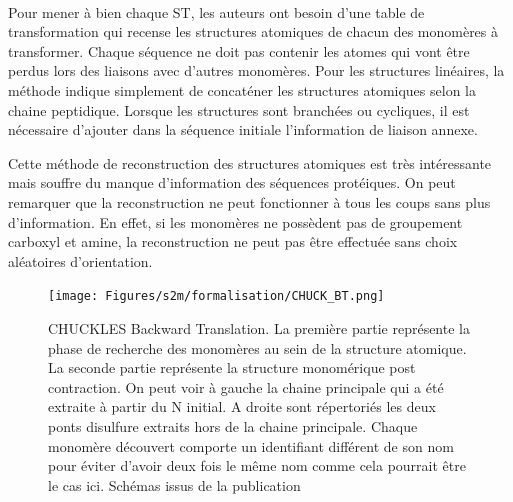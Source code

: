 \documentclass[12pt,french,twoside]{report}
\begin{document}
\paragraph{}Pour mener à bien chaque ST, les auteurs ont besoin d'une table de transformation qui recense les structures atomiques de chacun des monomères à transformer.
Chaque séquence ne doit pas contenir les atomes qui vont être perdus lors des liaisons avec d'autres monomères.
Pour les structures linéaires, la méthode indique simplement de concaténer les structures atomiques selon la chaine peptidique.
Lorsque les structures sont branchées ou cycliques, il est nécessaire d'ajouter dans la séquence initiale l'information de liaison annexe.

Cette méthode de reconstruction des structures atomiques est très intéressante mais souffre du manque d'information des séquences protéiques.
On peut remarquer que la reconstruction ne peut fonctionner à tous les coups sans plus d'information.
En effet, si les monomères ne possèdent pas de groupement carboxyl et amine, la reconstruction ne peut pas être effectuée sans choix aléatoires d'orientation.

\begin{figure}[!h]
  \begin{center}
    \texttt{[image: Figures/s2m/formalisation/CHUCK\_BT.png]}
    \caption{\label{chuck_bt}CHUCKLES Backward Translation.
    La première partie représente la phase de recherche des monomères au sein de la structure atomique.
    La seconde partie représente la structure monomérique post contraction.
    On peut voir à gauche la chaine principale qui a été extraite à partir du N initial.
    A droite sont répertoriés les deux ponts disulfure extraits hors de la chaine principale.
    Chaque monomère découvert comporte un identifiant différent de son nom pour éviter d'avoir deux fois le même nom comme cela pourrait être le cas ici.
    Schémas issus de la publication}
  \end{center}
\end{figure}
\end{document}
